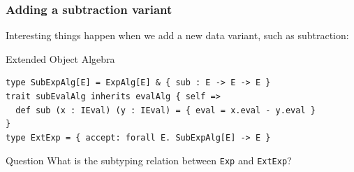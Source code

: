 \documentclass{beamer}
\begin{document}
\begin{frame}[fragile]
  \frametitle{Adding a subtraction variant}

  Interesting things happen when we add a new data variant, such as subtraction:


\begin{exampleblock}{Extended Object Algebra}
\begin{lstlisting}
type SubExpAlg[E] = ExpAlg[E] & { sub : E -> E -> E }
trait subEvalAlg inherits evalAlg { self =>
  def sub (x : IEval) (y : IEval) = { eval = x.eval - y.eval }
}
type ExtExp = { accept: forall E. SubExpAlg[E] -> E }
\end{lstlisting}
\end{exampleblock}

\pause

\begin{alertblock}{Question}
  What is the subtyping relation between \lstinline{Exp} and \lstinline{ExtExp}?
\end{alertblock}




\end{frame}
\end{document}
